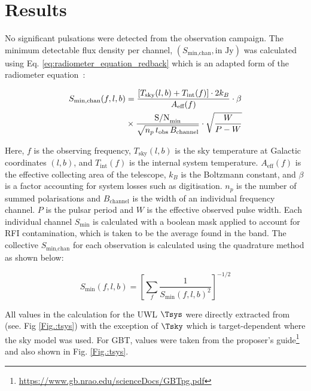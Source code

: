 \section{Results} \label{sec:results_rb}
No significant pulsations were detected from the observation campaign. The minimum detectable flux density per channel, $( S_{\text{min,chan}}, \text{in Jy})$ was calculated using Eq. \ref{eq:radiometer_equation_redback} which is an adapted form of the radiometer equation~\citep{pulsar_handbook}: 

\begin{equation}
\begin{split}
S_{\min,\rm{chan}}(f, l, b) &= \frac{\left[ T_{\text{sky}}(l,b) + T_{\text{int}}(f) \right] \cdot 2 k_B}{A_{\text{eff}}(f)} \cdot \beta \\ & \times \frac{\text{S/N}_{\min}}{\sqrt{n_p\, t_{\text{obs}}\, B_{\text{channel}}}} \cdot \sqrt{\frac{W}{P - W}}
 \label{eq:radiometer_equation_redback}
\end{split}
\end{equation}

Here, $f$ is the observing frequency, $T_{\text{sky}}(l, b)$ is the sky temperature at Galactic coordinates $(l, b)$, and $T_{\text{int}}(f)$ is the internal system temperature. $A_{\text{eff}}(f)$ is the effective collecting area of the telescope, $k_B$ is the Boltzmann constant, and $\beta$ is a factor accounting for system losses such as digitisation. $n_p$ is the number of summed polarisations and $B_{\text{channel}}$ is the width of an individual frequency channel. $P$ is the pulsar period and $W$ is the effective observed pulse width. Each individual channel $S_{\text{min}}$ is calculated with a boolean mask applied to account for RFI contamination, which is taken to be the average found in the band. The collective $S_\text{min,chan}$ for each observation is calculated using the quadrature method as shown below:  

\begin{equation}
    S_{\min}(f, l, b) = \left[ \sum_f \frac{1}{S_{\min}(f, l, b)^2} \right]^{-1/2}
    \label{eq:quadrature_redback}
\end{equation}

All values in the calculation for the UWL $\Tsys$ were directly extracted from \cite{hobbs_ultra-wide_2020} (see. Fig \ref{Fig.:tsys}) with the exception of $\Tsky$ which is target-dependent where the \cite{zheng_improved_2017} sky model was used. For GBT, values were taken from the proposer's guide\footnote{\url{https://www.gb.nrao.edu/scienceDocs/GBTpg.pdf}} and also shown in Fig. \ref{Fig.:tsys}.

